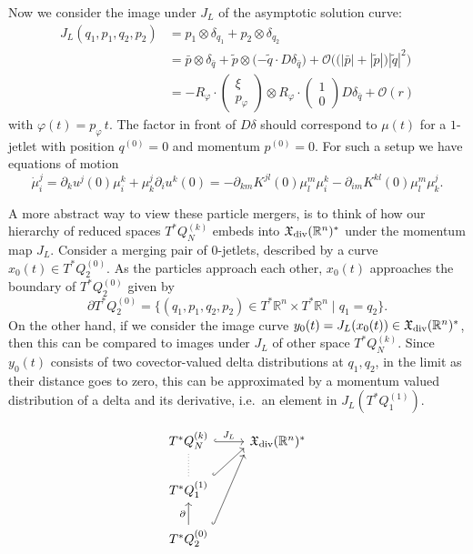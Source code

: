 \documentclass[a4paper,11pt]{article}
\newcommand{\R}{\ensuremath{\mathbb{R}}}
\begin{document}
Now we consider the image under $J_L$ of the asymptotic solution
curve:
\begin{align*}
  J_L(q_1,p_1,q_2,p_2)
  &= p_1 \otimes \delta_{q_1} + p_2 \otimes \delta_{q_2} \\
  &= \bar{p} \otimes \delta_{\bar{q}}
    +\tilde{p} \otimes \big({-\tilde{q}} \cdot D\delta_{\bar{q}}\big)
    +\mathcal{O}\Big(\big(|\bar{p}|+|\tilde{p}|\big)|\tilde{q}|^2\Big) \\
  &=-R_\varphi \cdot \begin{pmatrix} \xi \\ p_\varphi \end{pmatrix} \otimes
     R_\varphi \cdot \begin{pmatrix} 1 \\ 0 \end{pmatrix} D\delta_{\bar{q}}
    +\mathcal{O}(r)
\end{align*}
with $\varphi(t) = p_\varphi\,t$. The factor in front of $D\delta$
should correspond to $\mu(t)$ for a $1$-jetlet with position
$q^{(0)} = 0$ and momentum $p^{(0)} = 0$. For such a setup we have
equations of motion
\begin{equation}
  \dot{\mu}_i^j
  = \partial_k u^j(0) \mu_i^k + \mu_k^j \partial_i u^k(0)
  = -\partial_{km} K^{jl}(0) \mu_l^m \mu_i^k
    -\partial_{im} K^{kl}(0) \mu_l^m \mu_k^j.
\end{equation}


\clearpage

A more abstract way to view these particle mergers, is to think of how
our hierarchy of reduced spaces $T^*Q_N^{(k)}$ embeds into
$\mathfrak{X}_{\rm div}(\R^n)^*$ under the momentum map $J_L$.
Consider a merging pair of $0$-jetlets, described by a curve
$x_0(t) \in T^*Q_2^{(0)}$. As the particles approach each other,
$x_0(t)$ approaches the boundary of $T^*Q_2^{(0)}$ given by
\begin{equation}\label{eq:boundary}
  \partial T^*Q_2^{(0)}
  = \{ (q_1,p_1,q_2,p_2) \in T^* \R^n \times T^* \R^n \mid q_1 = q_2 \}.
\end{equation}
On the other hand, if we consider the image curve
$y_0(t) = J_L(x_0(t)) \in \mathfrak{X}_{\rm div}(\R^n)^*$, then this
can be compared to images under $J_L$ of other space $T^*Q_N^{(k)}$.
Since $y_0(t)$ consists of two covector-valued delta distributions at
$q_1,q_2$, in the limit as their distance goes to zero, this can be
approximated by a momentum valued distribution of a delta and its
derivative, i.e.~an element in $J_L(T^*Q_1^{(1)})$.

\begin{equation}
  \begin{tikzcd}
    T^*Q_N^{(k)} \ar[to=1-2,hook, "J_L"] & \mathfrak{X}_{\rm div}(\R^n)^* \\
    T^*Q_1^{(1)} \ar[to=1-2,hook,start anchor=north east,end anchor={[yshift=-0.5em]west}]
                 \ar[u,dotted,no head] &  \\
    T^*Q_2^{(0)} \ar[to=1-2,hook,start anchor=north east,end anchor={[yshift=-1.0em]west}]
                 \ar[u,"\partial"] &
  \end{tikzcd}
\end{equation}
\end{document}
